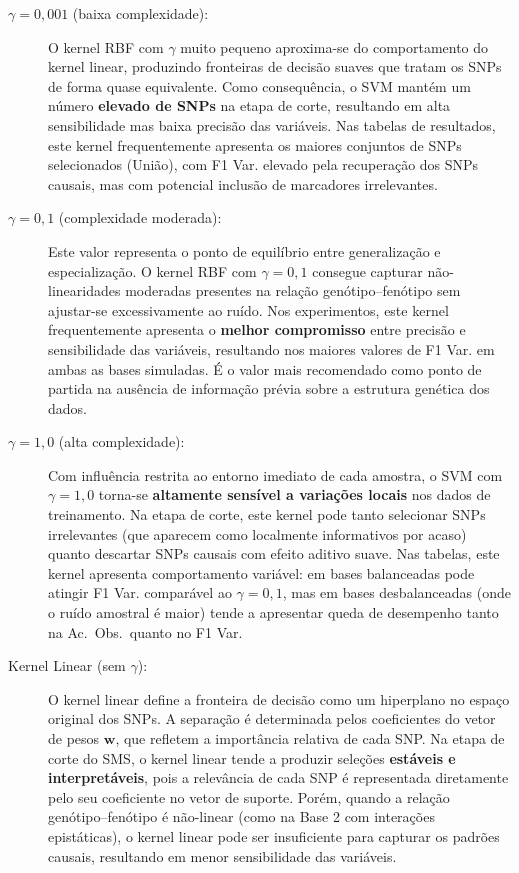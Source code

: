 \documentclass[
    12pt,
    a4paper,
    oneside,
    english,
    french,
    spanish,
    brazil
    ]{abntex2}
\newcommand{\novo}[1]{\textcolor{corNova}{#1}}
\begin{document}
\begin{description}
  \item[\novo{$\gamma = 0{,}001$ (baixa complexidade):}]
  \novo{O kernel RBF com $\gamma$ muito pequeno aproxima-se do comportamento do kernel linear, produzindo fronteiras de decisão suaves que tratam os SNPs de forma quase equivalente. Como consequência, o SVM mantém um número \textbf{elevado de SNPs} na etapa de corte, resultando em alta sensibilidade mas baixa precisão das variáveis. Nas tabelas de resultados, este kernel frequentemente apresenta os maiores conjuntos de SNPs selecionados (União), com F1 Var. elevado pela recuperação dos SNPs causais, mas com potencial inclusão de marcadores irrelevantes.}

  \item[\novo{$\gamma = 0{,}1$ (complexidade moderada):}]
  \novo{Este valor representa o ponto de equilíbrio entre generalização e especialização. O kernel RBF com $\gamma = 0{,}1$ consegue capturar não-linearidades moderadas presentes na relação genótipo--fenótipo sem ajustar-se excessivamente ao ruído. Nos experimentos, este kernel frequentemente apresenta o \textbf{melhor compromisso} entre precisão e sensibilidade das variáveis, resultando nos maiores valores de F1 Var. em ambas as bases simuladas. É o valor mais recomendado como ponto de partida na ausência de informação prévia sobre a estrutura genética dos dados.}

  \item[\novo{$\gamma = 1{,}0$ (alta complexidade):}]
  \novo{Com influência restrita ao entorno imediato de cada amostra, o SVM com $\gamma = 1{,}0$ torna-se \textbf{altamente sensível a variações locais} nos dados de treinamento. Na etapa de corte, este kernel pode tanto selecionar SNPs irrelevantes (que aparecem como localmente informativos por acaso) quanto descartar SNPs causais com efeito aditivo suave. Nas tabelas, este kernel apresenta comportamento variável: em bases balanceadas pode atingir F1 Var. comparável ao $\gamma = 0{,}1$, mas em bases desbalanceadas (onde o ruído amostral é maior) tende a apresentar queda de desempenho tanto na Ac.\ Obs.\ quanto no F1 Var.}

  \item[\novo{Kernel Linear (sem $\gamma$):}]
  \novo{O kernel linear define a fronteira de decisão como um hiperplano no espaço original dos SNPs. A separação é determinada pelos coeficientes do vetor de pesos $\mathbf{w}$, que refletem a importância relativa de cada SNP. Na etapa de corte do SMS, o kernel linear tende a produzir seleções \textbf{estáveis e interpretáveis}, pois a relevância de cada SNP é representada diretamente pelo seu coeficiente no vetor de suporte. Porém, quando a relação genótipo--fenótipo é não-linear (como na Base 2 com interações epistáticas), o kernel linear pode ser insuficiente para capturar os padrões causais, resultando em menor sensibilidade das variáveis.}
\end{description}
\end{document}
